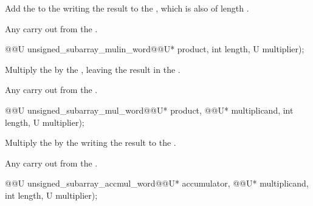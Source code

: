 \begin{addedblock}
\begin{itemdescr}

\effects Add the  to the  writing the result to the , which is also of length .

\returns Any carry out from the .    
\end{itemdescr}

\begin{itemdecl}
@@U unsigned_subarray_mulin_word@\tcode{\addmodif{(}}@U* product, int length, U multiplier);
\end{itemdecl}

\begin{itemdescr}

\effects Multiply the  by the , leaving the result in the .

\returns Any carry out from the .
\end{itemdescr}

\begin{itemdecl}
@@U unsigned_subarray_mul_word@\tcode{\addmodif{(}}@U* product, @@U* multiplicand, int length, U multiplier);
\end{itemdecl}

\begin{itemdescr}

\effects Multiply the  by the  writing the result to the .

\returns Any carry out from the .
\end{itemdescr}

\begin{itemdecl}
@@U unsigned_subarray_accmul_word@\tcode{\addmodif{(}}@U* accumulator, @@U* multiplicand, int length, U multiplier);
\end{itemdecl}


\end{addedblock}
